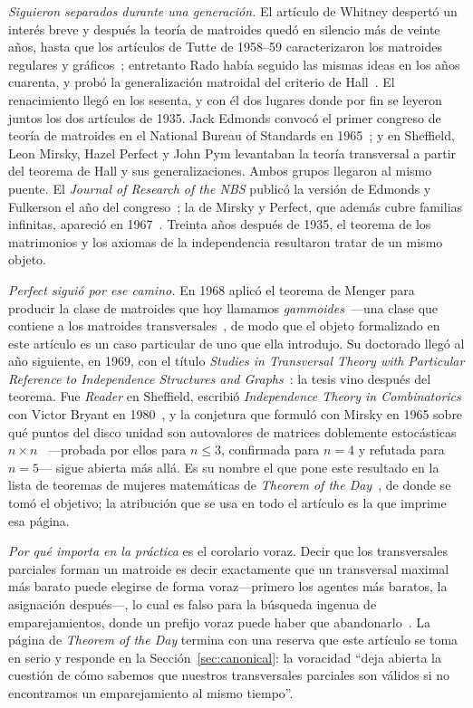 \documentclass[11pt]{article}
\begin{document}
\emph{Siguieron separados durante una generación.} El artículo de Whitney despertó un interés
breve y después la teoría de matroides quedó en silencio más de veinte años, hasta que los
artículos de Tutte de 1958--59 caracterizaron los matroides regulares y gráficos~\cite{farroxley};
entretanto Rado había seguido las mismas ideas en los años cuarenta, y probó la generalización
matroidal del criterio de Hall~\cite{rado}. El renacimiento llegó en los sesenta, y con él dos
lugares donde por fin se leyeron juntos los dos artículos de 1935. Jack Edmonds convocó el primer
congreso de teoría de matroides en el National Bureau of Standards en 1965~\cite{oxleywelsh}; y en
Sheffield, Leon Mirsky, Hazel Perfect y John Pym levantaban la teoría transversal a partir del
teorema de Hall y sus generalizaciones. Ambos grupos llegaron al mismo puente. El \emph{Journal of
Research of the NBS} publicó la versión de Edmonds y Fulkerson el año del
congreso~\cite{edmondsfulkerson}; la de Mirsky y Perfect, que además cubre familias infinitas,
apareció en 1967~\cite{mirskyperfect}. Treinta años después de 1935, el teorema de los matrimonios
y los axiomas de la independencia resultaron tratar de un mismo objeto.

\emph{Perfect siguió por ese camino.} En 1968 aplicó el teorema de Menger para producir la clase de
matroides que hoy llamamos \emph{gammoides}~\cite{perfect}---una clase que contiene a los matroides
transversales~\cite{oxley,ingleton}, de modo que el objeto formalizado en este artículo es un caso
particular de uno que ella introdujo. Su doctorado llegó al año siguiente, en 1969, con el título
\emph{Studies in Transversal Theory with Particular Reference to Independence Structures and
Graphs}~\cite{perfectthesis}: la tesis vino después del teorema. Fue \emph{Reader} en Sheffield,
escribió \emph{Independence Theory in Combinatorics} con Victor Bryant en
1980~\cite{bryantperfect}, y la conjetura que formuló con Mirsky en 1965 sobre qué puntos del disco
unidad son autovalores de matrices doblemente estocásticas $n\times n$~\cite{perfectmirsky}
---probada por ellos para $n\le 3$, confirmada para $n=4$ y refutada para $n=5$--- sigue abierta
más allá. Es su nombre el que pone este resultado en la lista de teoremas de mujeres matemáticas de
\emph{Theorem of the Day}~\cite{totd}, de donde se tomó el objetivo; la atribución que se usa en
todo el artículo es la que imprime esa página.

\emph{Por qué importa en la práctica} es el corolario voraz. Decir que los transversales parciales
forman un matroide es decir exactamente que un transversal maximal más barato puede elegirse de
forma voraz---primero los agentes más baratos, la asignación después---, lo cual es falso para la
búsqueda ingenua de emparejamientos, donde un prefijo voraz puede haber que abandonarlo~\cite{totd}.
La página de \emph{Theorem of the Day} termina con una reserva que este artículo se toma en serio y
responde en la Sección~\ref{sec:canonical}: la voracidad ``deja abierta la cuestión de cómo sabemos
que nuestros transversales parciales son válidos si no encontramos un emparejamiento al mismo
tiempo''.
\end{document}
